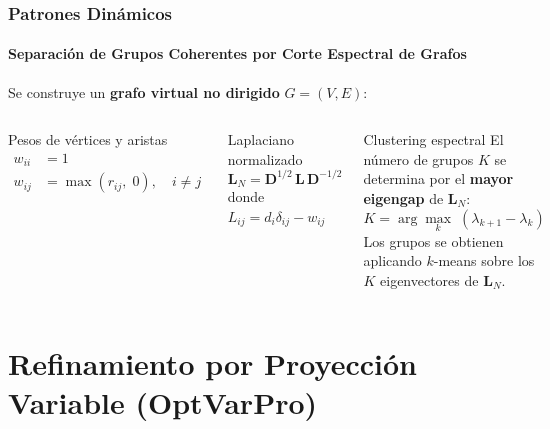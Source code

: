 \documentclass{beamer}
\begin{document}
\begin{frame}
\frametitle{Patrones Dinámicos}
\framesubtitle{Separación de Grupos Coherentes por Corte Espectral de Grafos}

Se construye un \textbf{grafo virtual no dirigido} $G = (V, E)$:

\begin{columns}
\begin{block}{Pesos de vértices y aristas}
\begin{align}
    w_{ii} &= 1 \label{eq:vertex_w}\\[2pt]
    w_{ij} &= \max(r_{ij},\; 0),\quad i\neq j \label{eq:edge_w}
\end{align}
\end{block}

\begin{block}{Laplaciano normalizado}
\begin{equation}
    \mathbf{L}_N = \mathbf{D}^{1/2}\,\mathbf{L}\,\mathbf{D}^{-1/2}
    \label{eq:laplacian}
\end{equation}
donde $L_{ij} = d_i\delta_{ij} - w_{ij}$
\end{block}

\begin{exampleblock}{Clustering espectral}
    El número de grupos $K$ se determina por el \textbf{mayor eigengap} de $\mathbf{L}_N$:
    \begin{equation}
        K = \arg\max_k\;
        (\lambda_{k+1} - \lambda_k)
        \label{eq:eigengap}
    \end{equation}
    Los grupos se obtienen aplicando $k$-means sobre los $K$ eigenvectores de $\mathbf{L}_N$.
\end{exampleblock}
\end{columns}

\end{frame}

\section{Refinamiento por Proyección Variable (OptVarPro)}
\end{document}
